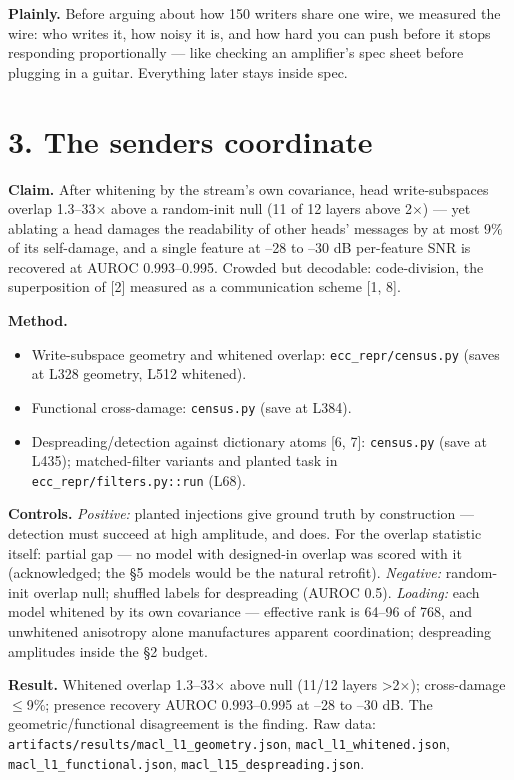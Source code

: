\documentclass[10pt]{article}
\begin{document}
\textbf{Plainly.} Before arguing about how 150 writers share one wire, we measured the wire: who writes
it, how noisy it is, and how hard you can push before it stops responding proportionally --- like
checking an amplifier's spec sheet before plugging in a guitar. Everything later stays inside spec.

\section{3. The senders coordinate}

\textbf{Claim.} After whitening by the stream's own covariance, head write-subspaces overlap 1.3--33$\times$
above a random-init null (11 of 12 layers above 2$\times$) --- yet ablating a head damages the readability
of other heads' messages by at most 9\% of its self-damage, and a single feature at --28 to --30 dB
per-feature SNR is recovered at AUROC 0.993--0.995. Crowded but decodable: code-division, the
superposition of [2] measured as a communication scheme [1, 8].

\textbf{Method.}
\begin{itemize}\setlength\itemsep{1pt}
\item Write-subspace geometry and whitened overlap: \texttt{ecc\_repr/census.py} (saves at L328 geometry, L512 whitened).
\item Functional cross-damage: \texttt{census.py} (save at L384).
\item Despreading/detection against dictionary atoms [6, 7]: \texttt{census.py} (save at L435); matched-filter variants and planted task in \texttt{ecc\_repr/filters.py::run} (L68).
\end{itemize}
\textbf{Controls.} \emph{Positive:} planted injections give ground truth by construction --- detection must
succeed at high amplitude, and does. For the overlap statistic itself: partial gap --- no model with
designed-in overlap was scored with it (acknowledged; the §5 models would be the natural retrofit).
\emph{Negative:} random-init overlap null; shuffled labels for despreading (AUROC 0.5). \emph{Loading:} each
model whitened by its own covariance --- effective rank is 64--96 of 768, and unwhitened anisotropy
alone manufactures apparent coordination; despreading amplitudes inside the §2 budget.

\textbf{Result.} Whitened overlap 1.3--33$\times$ above null (11/12 layers >2$\times$); cross-damage $\le$9\%; presence
recovery AUROC 0.993--0.995 at --28 to --30 dB. The geometric/functional disagreement is the finding.
Raw data: \texttt{artifacts/results/macl\_l1\_geometry.json}, \texttt{macl\_l1\_whitened.json},
\texttt{macl\_l1\_functional.json}, \texttt{macl\_l15\_despreading.json}.
\end{document}
